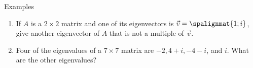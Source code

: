 \begin{frame}{Examples} 

    \vspace{-12pt}
    \begin{enumerate}
    
        \item If $A$ is a $2\times2$ matrix and one of its eigenvectors is $\vec v = \spalignmat{1;i}$, give another  eigenvector of $A$ that is not a multiple of $\vec v$. 
        \vspace{24pt}
        \item Four of the eigenvalues of a $7\times7$ matrix are $-2, 4+i, -4 - i$, and $i$. What are the other eigenvalues? 

    \end{enumerate}
    
\end{frame}













